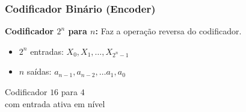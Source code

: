 \documentclass{beamer}
\begin{document}
\begin{frame}
\frametitle{Codificador Binário (Encoder)}

\textbf{Codificador $2^n$ para $n$:} Faz a operação reversa do codificador. 
\begin{itemize}
\item $2^n$ entradas: $X_0, X_1, \ldots, X_{2^n-1}$
\item $n$ saídas: $a_{n-1}, a_{n-2}, \ldots a_1, a_0$
\end{itemize}

\vspace{6pt}

\pause
\begin{center}
\begin{minipage}{44mm}
\end{minipage}
\begin{minipage}{50mm}
Codificador $16$ para $4$\\
com entrada ativa em nível
\end{minipage}
\end{center}


\end{frame}
\end{document}

